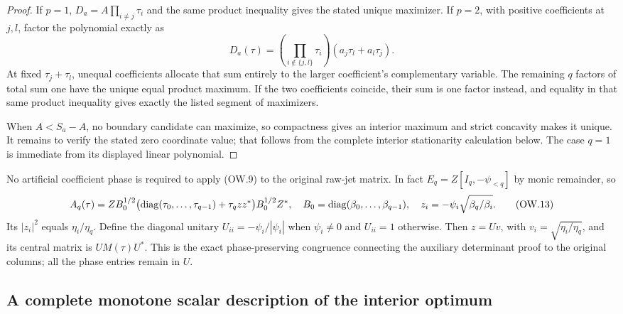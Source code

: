 \begin{proof}
If $p=1$, $D_a=A\prod_{i\ne j}\tau_i$ and the same product
inequality gives the stated unique maximizer. If $p=2$, with
positive coefficients at $j,l$, factor the polynomial exactly as
\[
 D_a(\tau)=\left(\prod_{i\notin\{j,l\}}\tau_i\right)
                (a_j\tau_l+a_l\tau_j).                  \tag{OW.12}
\]
At fixed $\tau_j+\tau_l$, unequal coefficients allocate that
sum entirely to the larger coefficient's complementary variable.
The remaining $q$ factors of total sum one have the unique equal
product maximum. If the two coefficients coincide, their sum is
one factor instead, and equality in that same product inequality
gives exactly the listed segment of maximizers.

When $A<S_a-A$, no boundary candidate can maximize, so compactness
gives an interior maximum and strict concavity makes it unique.
It remains to verify the stated zero coordinate value; that follows
from the complete interior stationarity calculation below. The
case $q=1$ is immediate from its displayed linear polynomial.
\end{proof}

No artificial coefficient phase is required to apply (OW.9) to the
original raw-jet matrix. In fact $E_q=Z[I_q,-\psi_{<q}]$ by monic
remainder, so
\[
 A_q(\tau)=ZB_0^{1/2}
  \bigl(\operatorname{diag}(\tau_0,\ldots,\tau_{q-1})+\tau_q zz^*\bigr)
  B_0^{1/2}Z^*,\quad
 B_0=\operatorname{diag}(\beta_0,\ldots,\beta_{q-1}),\quad
 z_i=-\psi_i\sqrt{\beta_q/\beta_i}.                       \tag{OW.13}
\]
Its $|z_i|^2$ equals $\eta_i/\eta_q$. Define the diagonal unitary
$U_{ii}=-\psi_i/|\psi_i|$ when $\psi_i\ne0$ and $U_{ii}=1$
otherwise. Then $z=Uv$, with $v_i=\sqrt{\eta_i/\eta_q}$,
and its central matrix is $UM(\tau)U^*$. This is the exact
phase-preserving congruence connecting the auxiliary determinant
proof to the original columns; all the phase entries remain in $U$.

\subsection{A complete monotone scalar description of the interior optimum}

